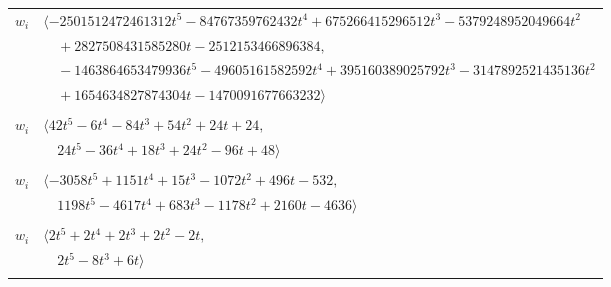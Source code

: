 \documentclass[11pt]{article}
\begin{document}
\begin{longtable}{@{}ll@{}}
$w_i$ & $\langle -2501512472461312t^{5}-84767359762432t^{4}+675266415296512t^{3}-5379248952049664t^{2}$\\
 & $\quad +2827508431585280t-2512153466896384,$\\
 & $\quad -1463864653479936t^{5}-49605161582592t^{4}+395160389025792t^{3}-3147892521435136t^{2}$\\
 & $\quad +1654634827874304t-1470091677663232\rangle$\\
\addlinespace[2pt]
\multicolumn{2}{@{}p{0.97\textwidth}@{}}{$i=17$, $D_i=1$, $\rho_{ij}$: $2{:}3, \allowbreak 5{:}1, \allowbreak 18{:}3, \allowbreak 29{:}2, \allowbreak 30{:}1, \allowbreak 45{:}1, \allowbreak 49{:}1, \allowbreak 50{:}2, \allowbreak 51{:}1, \allowbreak 53{:}3, \allowbreak 56{:}1, \allowbreak 58{:}1, \allowbreak 59{:}1, \allowbreak 64{:}1, \allowbreak 67{:}3, \allowbreak 81{:}2$}\\
$w_i$ & $\langle 42t^{5}-6t^{4}-84t^{3}+54t^{2}+24t+24,$\\
 & $\quad 24t^{5}-36t^{4}+18t^{3}+24t^{2}-96t+48\rangle$\\
\addlinespace[2pt]
\multicolumn{2}{@{}p{0.97\textwidth}@{}}{$i=18$, $D_i=1$, $\rho_{ij}$: $1{:}1, \allowbreak 2{:}1, \allowbreak 9{:}2, \allowbreak 12{:}3, \allowbreak 17{:}1, \allowbreak 34{:}1, \allowbreak 35{:}3, \allowbreak 46{:}1, \allowbreak 47{:}2, \allowbreak 53{:}1, \allowbreak 58{:}3, \allowbreak 64{:}3, \allowbreak 65{:}2, \allowbreak 71{:}2, \allowbreak 75{:}3, \allowbreak 76{:}1, \allowbreak 77{:}3$}\\
$w_i$ & $\langle -3058t^{5}+1151t^{4}+15t^{3}-1072t^{2}+496t-532,$\\
 & $\quad 1198t^{5}-4617t^{4}+683t^{3}-1178t^{2}+2160t-4636\rangle$\\
\addlinespace[2pt]
\multicolumn{2}{@{}p{0.97\textwidth}@{}}{$i=19$, $D_i=1$, $\rho_{ij}$: $13{:}2, \allowbreak 20{:}2, \allowbreak 25{:}2, \allowbreak 42{:}2, \allowbreak 58{:}2, \allowbreak 70{:}2, \allowbreak 73{:}2$}\\
$w_i$ & $\langle 2t^{5}+2t^{4}+2t^{3}+2t^{2}-2t,$\\
 & $\quad 2t^{5}-8t^{3}+6t\rangle$\\
\addlinespace[2pt]
\multicolumn{2}{@{}p{0.97\textwidth}@{}}{$i=20$, $D_i=1$, $\rho_{ij}$: $2{:}3, \allowbreak 4{:}1, \allowbreak 6{:}1, \allowbreak 10{:}2, \allowbreak 16{:}1, \allowbreak 19{:}2, \allowbreak 22{:}2, \allowbreak 24{:}1, \allowbreak 25{:}3, \allowbreak 35{:}3, \allowbreak 36{:}1, \allowbreak 38{:}1, \allowbreak 39{:}3, \allowbreak 43{:}3, \allowbreak 50{:}2, \allowbreak 51{:}1, \allowbreak 56{:}1, \allowbreak 59{:}1, \allowbreak 63{:}2, \allowbreak 65{:}3, \allowbreak 66{:}3, \allowbreak 68{:}1$}\\

\end{longtable}
\end{document}

